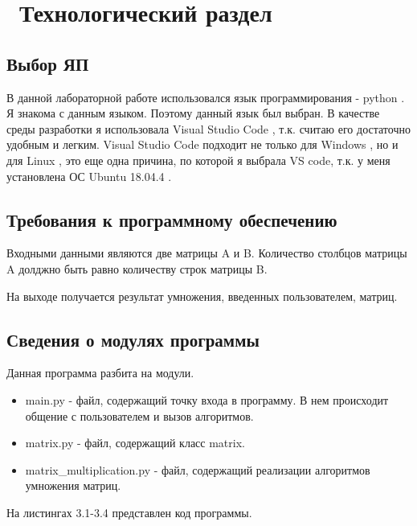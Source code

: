 \chapter{ Технологический раздел}
\label{cha:design}

\section{Выбор ЯП}

В данной лабораторной работе использовался язык программирования - python \cite{bib1}.
Я знакома с данным языком.
Поэтому данный язык был выбран. 
В качестве среды разработки я использовала Visual Studio Code \cite{bib2}, т.к. считаю его достаточно удобным и легким.
Visual Studio Code подходит не только для  Windows \cite{bib3}, но и для Linux \cite{bib4}, это еще одна причина, по которой я выбрала VS code, т.к. у меня установлена ОС Ubuntu 18.04.4 \cite{bib5}.

\section{Требования к программному обеспечению}

Входными данными являются две матрицы A и B.
Количество столбцов матрицы A долджно быть равно количеству строк матрицы B. 

На выходе получается результат умножения, введенных пользователем, матриц.

\section{Сведения о модулях программы}

Данная программа разбита на модули.

\begin{itemize}
    \item main.py - файл, содержащий точку входа в программу. В нем происходит общение с пользователем и вызов алгоритмов.
    \item matrix.py - файл, содержащий класс matrix.
    \item matrix\_multiplication.py - файл, содержащий реализации алгоритмов умножения матриц.
\end{itemize}

На листингах 3.1-3.4 представлен код программы.

